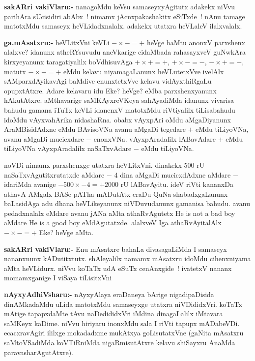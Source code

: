 \smallskip
\noindent
\textbf{sakARri vakiVlaru:-} nanagoMdu keVsu samaseyxyAgitutx adakekx niVvu parihAra sUcisidiri abAbx~! nimamx jAcnxpakashakitx eSiTxde~! nAnu tamage matotxMdu samaseyx heVLidadxnalalx. adakekx utatxra heVLaleV ilalxvalalx.

\smallskip
\noindent
\textbf{ga.mAsatxru:-} heVLitxVni keVLi $-\times -=+$ heVge baMtu anonxV parxshenx alalxve? idanunx atheRYsuvudu aneVkarige cidaMbada rahasayxveV guNwkAra kirxyeyanunx taragatiyalilx boVdhisuvAga $+\times +=+$, \quad $+\times -=-$, \quad $-\times +=-$, matutx $-\times -=+$ eMdu kelavu niyamagaLanunx heVLutetxVve ivelAlx sAMparxdAyikavAgi baMdive enunxtetxVve kelavu vidAyxthiRgaLu opupxtAtxre. Adare kelavaru idu Eke? heVge? eMba parxshenxyanunx hAkutAtxre. aMthavarige saMKAyxreVKeya sahAyadiMda idanunx vivarisa bahudu gamana iTuTx keVLi idanenxV matotxMdu riVtiyalilx tiLisabahudu idoMdu vAyxvahArika nidashaRna. obabx vAyxpAri oMdu aMgaDiyanunx AraMBisidAdxne eMdu BAvisoVNa avanu aMgaDi tegedare $+$ eMdu tiLiyoVNa, avanu aMgaDi mucicxdare $-$ enonxVNa. vAyxpAradalilx lABavAdare $+$ eMdu tiLiyoVNa vAyxpAradalilx naSaTxvAdare $-$ eMdu tiLiyoVNa.

noVDi nimamx parxshenxge utatxra heVLitxVni. dinakekx {\rm 500} rU naSaTxvAgutitxrutatxde aMdare $-$ {\rm 4} dina aMgaDi mucicxdAdxne aMdare $-$ idariMda avanige $-500\times -4=+2000$ rU lABavAyitu. ideV riVti kananxDa athavA AMgalx BASe pATha mADutAtx eraDu QuNa shabadxgaLanunx baLasidAga adu dhana heVLikeyanunx niVDuvudanunx gamanisa bahudu. avanu pedadxnalalx eMdare avanu jANa aMta athaRvAgutetx {\rm He is not a bad boy} aMdare {\rm He is a good boy} eMdAgutatxde. alalxveV Iga athaRvAyitalAlx $-\times -=+$ Eke? heVge aMta.

\smallskip
\noindent
\textbf{sakARri vakiVlaru:-} Enu mAsatxre bahaLa divasagaLiMda I samaseyx nananxnunx kADutitxtutx. shAleyalilx namamx mAsatxru idoMdu cihenxniyama aMta heVLidurx. niVvu koTaTx udA eSuTx cenAnxgide~! ivatetxV nananx momamxganige I viSaya tiLisitxVni

\smallskip
\noindent
\textbf{nAyxyAdhiVsharu:-} nAyxyAlaya eraDaneya bArige nigadipaDisida dinAMkadaMdu uLida matotxMdu samaseyxge utatxra niVDididxVri. koTaTx mAtige tapapxdaMte tAvu naDedididxVri iMdina dinagaLalilx iMtavara saMKeyx kaDime. niVvu hiriyaru inonxMdu sala I riVti tapupx mADabeVDi. ecacxravAgiri ililxge mokadadxme mukAtxya goLisutatxVne (gaNita mAsatxru saMtoVSadiMda koVTiRniMda nigaRmisutAtxre kelavu shiSayxru AnaMda paravasharAgutAtxre).
